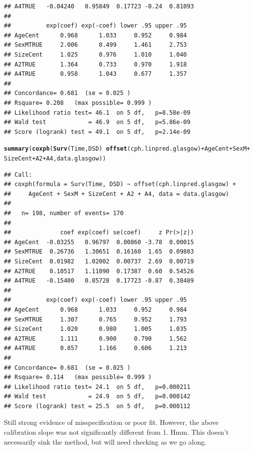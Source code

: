 \documentclass{article}\usepackage[]{graphicx}\usepackage[]{color}
\makeatletter
\newcommand{\hlopt}[1]{\textcolor[rgb]{0,0,0}{#1}}%
\newcommand{\hlstd}[1]{\textcolor[rgb]{0.345,0.345,0.345}{#1}}%
\newcommand{\hlkwd}[1]{\textcolor[rgb]{0.737,0.353,0.396}{\textbf{#1}}}%
\newenvironment{kframe}{%
 \def\at@end@of@kframe{}%
 \ifinner\ifhmode%
  \def\at@end@of@kframe{\end{minipage}}%
  \begin{minipage}{\columnwidth}%
 \fi\fi%
 \def\FrameCommand##1{\hskip\@totalleftmargin \hskip-\fboxsep
 \colorbox{shadecolor}{##1}\hskip-\fboxsep
     \hskip-\linewidth \hskip-\@totalleftmargin \hskip\columnwidth}%
 \MakeFramed {\advance\hsize-\width
   \@totalleftmargin\z@ \linewidth\hsize
   \@setminipage}}%
 {\par\unskip\endMakeFramed%
 \at@end@of@kframe}
\newenvironment{knitrout}{}{} %
\makeatother
\begin{document}
\begin{knitrout}
\begin{kframe}
\begin{verbatim}
## A4TRUE   -0.04240   0.95849  0.17723 -0.24  0.81093
## 
##          exp(coef) exp(-coef) lower .95 upper .95
## AgeCent      0.968      1.033     0.952     0.984
## SexMTRUE     2.006      0.499     1.461     2.753
## SizeCent     1.025      0.976     1.010     1.040
## A2TRUE       1.364      0.733     0.970     1.918
## A4TRUE       0.958      1.043     0.677     1.357
## 
## Concordance= 0.681  (se = 0.025 )
## Rsquare= 0.208   (max possible= 0.999 )
## Likelihood ratio test= 46.1  on 5 df,   p=8.58e-09
## Wald test            = 46.9  on 5 df,   p=5.86e-09
## Score (logrank) test = 49.1  on 5 df,   p=2.14e-09
\end{verbatim}
\begin{alltt}
\hlkwd{summary}\hlstd{(}\hlkwd{coxph}\hlstd{(}\hlkwd{Surv}\hlstd{(Time, DSD)} \hlopt{~} \hlkwd{offset}\hlstd{(cph.linpred.glasgow)} \hlopt{+} \hlstd{AgeCent} \hlopt{+} \hlstd{SexM} \hlopt{+} \hlstd{SizeCent} \hlopt{+} \hlstd{A2} \hlopt{+} \hlstd{A4, data.glasgow))}
\end{alltt}
\begin{verbatim}
## Call:
## coxph(formula = Surv(Time, DSD) ~ offset(cph.linpred.glasgow) + 
##     AgeCent + SexM + SizeCent + A2 + A4, data = data.glasgow)
## 
##   n= 198, number of events= 170 
## 
##              coef exp(coef) se(coef)     z Pr(>|z|)
## AgeCent  -0.03255   0.96797  0.00860 -3.78  0.00015
## SexMTRUE  0.26736   1.30651  0.16160  1.65  0.09803
## SizeCent  0.01982   1.02002  0.00737  2.69  0.00719
## A2TRUE    0.10517   1.11090  0.17387  0.60  0.54526
## A4TRUE   -0.15400   0.85728  0.17723 -0.87  0.38489
## 
##          exp(coef) exp(-coef) lower .95 upper .95
## AgeCent      0.968      1.033     0.952     0.984
## SexMTRUE     1.307      0.765     0.952     1.793
## SizeCent     1.020      0.980     1.005     1.035
## A2TRUE       1.111      0.900     0.790     1.562
## A4TRUE       0.857      1.166     0.606     1.213
## 
## Concordance= 0.681  (se = 0.025 )
## Rsquare= 0.114   (max possible= 0.999 )
## Likelihood ratio test= 24.1  on 5 df,   p=0.000211
## Wald test            = 24.9  on 5 df,   p=0.000142
## Score (logrank) test = 25.5  on 5 df,   p=0.000112
\end{verbatim}
\end{kframe}
\end{knitrout}
Still strong evidence of misspecification or poor fit.  However, the above calibration slope was not significantly different from 1.  Hmm.  This doesn't necessarily sink the method, but will need checking as we go along.
\end{document}
